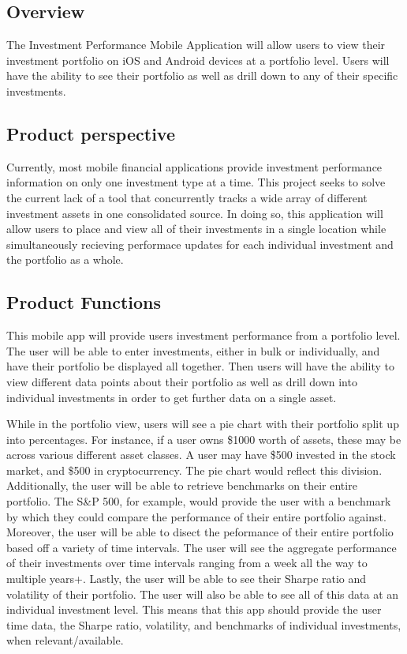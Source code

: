 \documentclass[onecolumn, draftclsnofoot,10pt, compsoc]{IEEEtran}
\begin{document}
\subsection{Overview}

The Investment Performance Mobile Application will allow users to view their investment portfolio on iOS and Android devices
at a portfolio level. Users will have the ability to see their portfolio as well as drill down to any of their specific investments.


\subsection{Product perspective}

Currently, most mobile financial applications provide investment performance information on only one investment type at a time. 
This project seeks to solve the current lack of a tool that concurrently tracks a wide array of different investment assets in 
one consolidated source. In doing so, this application will allow users to place and view all of their investments in a single location 
while simultaneously recieving performace updates for each individual investment and the portfolio as a whole.

\subsection{Product Functions}
This mobile app will provide users investment performance from a portfolio level. The user will be able to enter investments, either 
in bulk or individually, and have their portfolio be displayed all together. Then users will have the ability to view different data
points about their portfolio as well as drill down into individual investments in order to get further data on a single asset.

While in the portfolio view, users will see a pie chart with their portfolio split up into percentages. 
For instance, if a user owns \$1000 worth of assets, these may be across various different asset classes. A user may have \$500 invested in the stock market, 
and \$500 in cryptocurrency. The pie chart would reflect this division. Additionally, the user will be able to retrieve benchmarks on their entire portfolio. 
The S\&P 500, for example, would provide the user with a benchmark by which they could compare the performance of their entire portfolio against. 
Moreover, the user will be able to disect the peformance of their entire portfolio based off a variety of time intervals. The user will see the aggregate 
performance of their investments over time intervals ranging from a week all the way to multiple years+. Lastly, the user will be able to see their Sharpe ratio and volatility of their portfolio. 
The user will also be able to see all of this data at an individual investment level. This means that this app should provide the user 
time data, the Sharpe ratio, volatility, and benchmarks of individual investments, when relevant/available.
\end{document}
